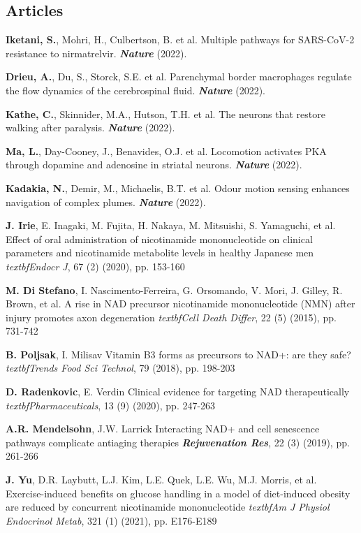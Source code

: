 \subsection*{Articles}
\vspace{-1.4mm}
\begin{etaremune}[itemsep=0pt,parsep=0pt,topsep=0pt,listparindent=0pt,itemindent=0pt,leftmargin=17.91524pt]
	\item \textbf{Iketani, S.}, Mohri, H., Culbertson, B. et al. Multiple pathways for SARS-CoV-2 resistance to nirmatrelvir. \textit{\textbf{Nature}} (2022).
	\item \textbf{Drieu, A.}, Du, S., Storck, S.E. et al. Parenchymal border macrophages regulate the flow dynamics of the cerebrospinal fluid. \textit{\textbf{Nature}} (2022).
	\item \textbf{Kathe, C.}, Skinnider, M.A., Hutson, T.H. et al. The neurons that restore walking after paralysis. \textit{\textbf{Nature}} (2022).
	\item \textbf{Ma, L.}, Day-Cooney, J., Benavides, O.J. et al. Locomotion activates PKA through dopamine and adenosine in striatal neurons. \textit{\textbf{Nature}} (2022).
	\item \textbf{Kadakia, N.}, Demir, M., Michaelis, B.T. et al. Odour motion sensing enhances navigation of complex plumes. \textit{\textbf{Nature}} (2022).
	\item \textbf{J. Irie}, E. Inagaki, M. Fujita, H. Nakaya, M. Mitsuishi, S. Yamaguchi, et al.
    Effect of oral administration of nicotinamide mononucleotide on clinical parameters and nicotinamide metabolite levels in healthy Japanese men
    \textit{textbf{Endocr J}}, 67 (2) (2020), pp. 153-160
    \item \textbf{M. Di Stefano}, I. Nascimento-Ferreira, G. Orsomando, V. Mori, J. Gilley, R. Brown, et al.
    A rise in NAD precursor nicotinamide mononucleotide (NMN) after injury promotes axon degeneration
    \textit{textbf{Cell Death Differ}}, 22 (5) (2015), pp. 731-742
    \item \textbf{B. Poljsak}, I. Milisav
    Vitamin B3 forms as precursors to NAD+: are they safe?
    \textit{textbf{Trends Food Sci Technol}}, 79 (2018), pp. 198-203
    \item \textbf{D. Radenkovic}, E. Verdin
    Clinical evidence for targeting NAD therapeutically
    \textit{textbf{Pharmaceuticals}}, 13 (9) (2020), pp. 247-263
    \item \textbf{A.R. Mendelsohn}, J.W. Larrick
    Interacting NAD+ and cell senescence pathways complicate antiaging therapies
    \textit{\textbf{Rejuvenation Res}}, 22 (3) (2019), pp. 261-266
    \item \textbf{J. Yu}, D.R. Laybutt, L.J. Kim, L.E. Quek, L.E. Wu, M.J. Morris, et al.
    Exercise-induced benefits on glucose handling in a model of diet-induced obesity are reduced by concurrent nicotinamide mononucleotide
    \textit{textbf{Am J Physiol Endocrinol Metab}}, 321 (1) (2021), pp. E176-E189
\end{etaremune}

